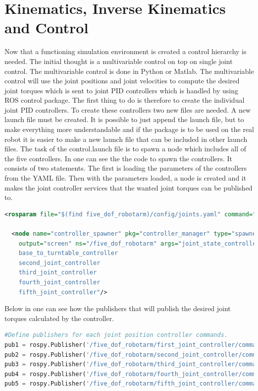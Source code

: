 \chapter{Kinematics, Inverse Kinematics and Control}

Now that a functioning simulation environment is created a control hierarchy is needed. The initial thought is a multivariable control on top on single joint control. The multivariable control is done in Python or Matlab. The multivariable control will use the joint positions and joint velocities to compute the desired joint torques which is sent to joint PID controllers which is handled by using ROS control package. The first thing to do is therefore to create the individual joint PID controllers. 
To create these controllers two new files are needed. A new launch file must be created. It is possible to just append the launch file, but to make everything more understandable and if the package is to be used on the real robot it is easier to make a new launch file that can be included in other launch files. The task of the control.launch file is to spawn a node which includes all of the five controllers. In  one can see the the code to spawn the controllers. It consists of two statements. The first is loading the parameters of the controllers from the YAML file. Then with the parameters loaded, a node is created and it makes the joint controller services that the wanted joint torques can be published to. 
\begin{lstlisting}[language=xml,caption={Spawns the controller node},label={lst:launchControl}]
<rosparam file="$(find five_dof_robotarm)/config/joints.yaml" command="load"/>

  <node name="controller_spawner" pkg="controller_manager" type="spawner" respawn="false"
	output="screen" ns="/five_dof_robotarm" args="joint_state_controller
    base_to_turntable_controller
    second_joint_controller
    third_joint_controller
    fourth_joint_controller
    fifth_joint_controller"/>
\end{lstlisting}
Below in  one can see how the publishers that will publish the desired joint torques calculated by the controller. 
\begin{lstlisting}[language=python,caption={Python code for creating the publishers.},label={lst:pythonPubl}]
#Define publishers for each joint position controller commands.
pub1 = rospy.Publisher('/five_dof_robotarm/first_joint_controller/command', Float64, queue_size=10)
pub2 = rospy.Publisher('/five_dof_robotarm/second_joint_controller/command', Float64, queue_size=10)
pub3 = rospy.Publisher('/five_dof_robotarm/third_joint_controller/command', Float64, queue_size=10)
pub4 = rospy.Publisher('/five_dof_robotarm/fourth_joint_controller/command', Float64, queue_size=10)
pub5 = rospy.Publisher('/five_dof_robotarm/fifth_joint_controller/command', Float64, queue_size=10)
\end{lstlisting}

